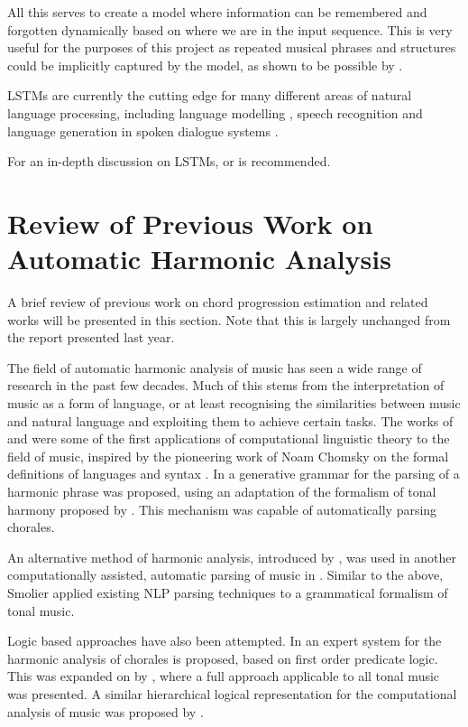 \documentclass[bsc,singlespacing,logo, parskip, deptreport]{infthesis}
\begin{document}
All this serves to create a model where information can be remembered and forgotten dynamically based on where we are in the input sequence. This is very useful for the purposes of this project as repeated musical phrases and structures could be implicitly captured by the model, as shown to be possible by \cite{eck2008learning}.

LSTMs are currently the cutting edge for many different areas of natural language processing, including language modelling \cite{sundermeyer2012lstm} \cite{pichotta2016using}, speech recognition \cite{han2017ese} and language generation in spoken dialogue systems \cite{wen2016multi}.

For an in-depth discussion on LSTMs, \cite{olah_2015} or \cite{greff2016lstm} is recommended.

\section{Review of Previous Work on Automatic Harmonic Analysis} \label{prev}

A brief review of previous work on chord progression estimation and related works will be presented in this section. Note that this is largely unchanged from the report presented last year.

The field of automatic harmonic analysis of music has seen a wide range of research in the past few decades. Much of this stems from the interpretation of music as a form of language, or at least recognising the similarities between music and natural language and exploiting them to achieve certain tasks. The works of \cite{winograd1968linguistics} and \cite{forte1967syntax} were some of the first applications of computational linguistic theory to the field of music, inspired by the pioneering work of Noam Chomsky on the formal definitions of languages and syntax \cite{lees1957syntactic}. In \cite{winograd1968linguistics} a generative grammar for the parsing of a harmonic phrase was proposed, using an adaptation of the formalism of tonal harmony proposed by \cite{forte1962tonal}. This mechanism was capable of automatically parsing chorales.

An alternative method of harmonic analysis, introduced by \cite{schenker1979harmony}, was used in another computationally assisted, automatic parsing of music in \cite{smoliar1979computer}. Similar to the above, Smolier applied existing NLP parsing techniques to a grammatical formalism of tonal music.

Logic based approaches have also been attempted. In \cite{ebciouglu1990expert} an expert system for the harmonic analysis of chorales is proposed, based on first order predicate logic. This was expanded on by \cite{maxwell1992expert}, where a full approach applicable to all tonal music was presented. A similar hierarchical logical representation for the computational analysis of music was proposed by \cite{smaill1993hierarchical}.
\end{document}
